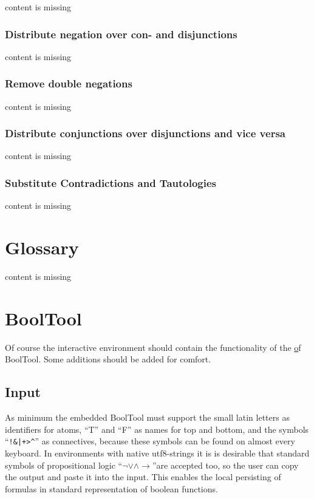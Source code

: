 content is missing

\subsubsection{Distribute negation over con- and disjunctions}

content is missing

\subsubsection{Remove double negations}

content is missing

\subsubsection{Distribute conjunctions over disjunctions and vice versa}

content is missing

\subsubsection{Substitute Contradictions and Tautologies}

content is missing

\section{Glossary}

content is missing

\section{BoolTool}

Of course the interactive environment should contain the functionality of the \href{web fronted} of BoolTool.
Some additions should be added for comfort.

\subsection{Input}

As minimum the embedded BoolTool must support the small latin letters as identifiers for atoms, 
“T” and “F” as names for top and bottom, and the symbols
“\verb#!&|+>^#” as connectives, because these symbols can be found on almost every keyboard.
In environments with native utf8-strings it is is desirable that standard symbols of propositional logic
“$ \neg \vee \wedge \rightarrow $”are accepted too, 
so the user can copy the output and paste it into the input. 
This enables the local persisting of formulas in standard representation of boolean functions.

